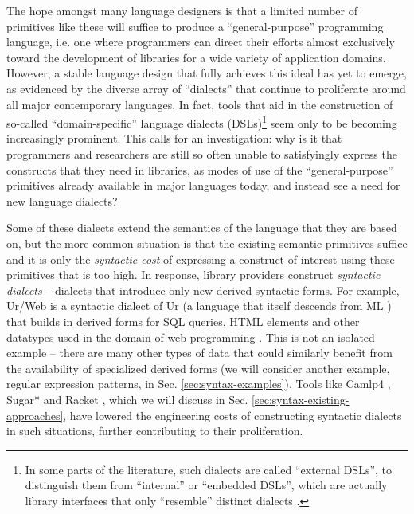 The hope amongst many language designers is that a limited number of primitives like these will suffice to produce a ``general-purpose'' programming language, i.e. one where programmers can direct their efforts almost exclusively toward the development of libraries for a wide variety of application domains. However, a stable language design that fully achieves this ideal has yet to emerge, as evidenced by the diverse array of ``dialects'' that continue to proliferate around all major contemporary languages. 
In fact, tools that aid in the construction of so-called  ``domain-specific'' language dialects (DSLs)\footnote{In some parts of the literature, such dialects are called ``external DSLs'', to distinguish them from  ``internal'' or ``embedded DSLs'', which are actually  library interfaces that only ``resemble'' distinct dialects \cite{fowler2010domain}.} seem only to be becoming increasingly prominent. 
{This calls for an investigation}: why is it that programmers and researchers are still so often unable to satisfyingly express the constructs that they need in libraries, as modes of use of the ``general-purpose'' primitives already available in major languages today, and instead see a need for new language dialects?

Some of these dialects extend the semantics of the language that they are based on, but the more common situation is that the existing semantic primitives suffice and it is only the \emph{syntactic cost} of expressing a construct of interest using these primitives  that is too high. In response, library providers construct \emph{syntactic dialects} -- dialects that introduce only new derived syntactic forms. 
For example, Ur/Web is a syntactic dialect of Ur (a language that itself descends from ML \cite{conf/pldi/Chlipala10}) that builds in derived forms for SQL queries, HTML elements and other datatypes used in the domain of web programming \cite{conf/popl/Chlipala15}. %
This is not an isolated example -- there are many other types of data that could similarly benefit from the availability of specialized derived forms (we will consider another example, regular expression patterns, in Sec. \ref{sec:syntax-examples}). 
Tools like Camlp4 \cite{ocaml-manual}, Sugar* \cite{erdweg2011sugarj,erdweg2013framework} and Racket \cite{Flatt:2012:CLR:2063176.2063195}, which we will discuss in Sec. \ref{sec:syntax-existing-approaches}, have lowered the engineering costs of constructing syntactic dialects in such situations, further contributing to their proliferation. 

